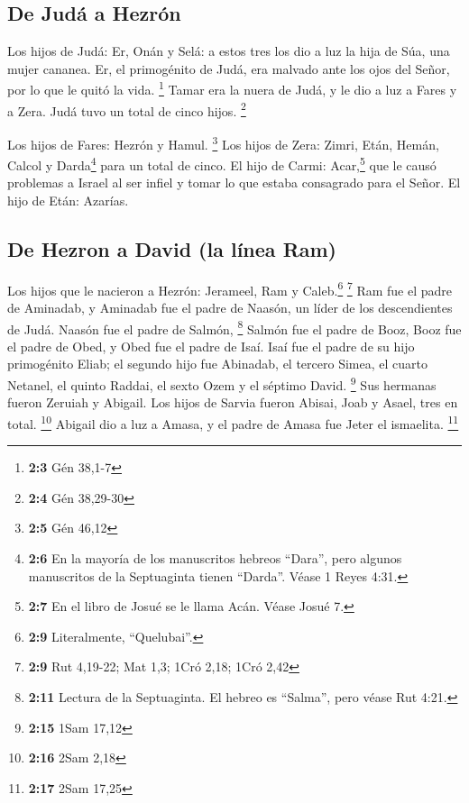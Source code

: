 \hypertarget{de-juduxe1-a-hezruxf3n}{%
\subsection{De Judá a Hezrón}\label{de-juduxe1-a-hezruxf3n}}

 Los hijos de Judá: Er, Onán y Selá: a estos tres los dio
a luz la hija de Súa, una mujer cananea. Er, el primogénito de Judá, era
malvado ante los ojos del Señor, por lo que le quitó la vida.
\footnote{\textbf{2:3} Gén 38,1-7}  Tamar era la nuera de
Judá, y le dio a luz a Fares y a Zera. Judá tuvo un total de cinco
hijos. \footnote{\textbf{2:4} Gén 38,29-30}

 Los hijos de Fares: Hezrón y Hamul. \footnote{\textbf{2:5}
  Gén 46,12}  Los hijos de Zera: Zimri, Etán, Hemán,
Calcol y Darda\footnote{\textbf{2:6} En la mayoría de los manuscritos
  hebreos ``Dara'', pero algunos manuscritos de la Septuaginta tienen
  ``Darda''. Véase 1 Reyes 4:31.} para un total de cinco. 
El hijo de Carmi: Acar,\footnote{\textbf{2:7} En el libro de Josué se le
  llama Acán. Véase Josué 7.} que le causó problemas a Israel al ser
infiel y tomar lo que estaba consagrado para el Señor.  El
hijo de Etán: Azarías.

\hypertarget{de-hezron-a-david-la-luxednea-ram}{%
\subsection{De Hezron a David (la línea
Ram)}\label{de-hezron-a-david-la-luxednea-ram}}

 Los hijos que le nacieron a Hezrón: Jerameel, Ram y
Caleb.\footnote{\textbf{2:9} Literalmente, ``Quelubai''.} \footnote{\textbf{2:9}
  Rut 4,19-22; Mat 1,3; 1Cró 2,18; 1Cró 2,42}  Ram fue el
padre de Aminadab, y Aminadab fue el padre de Naasón, un líder de los
descendientes de Judá.  Naasón fue el padre de Salmón,
\footnote{\textbf{2:11} Lectura de la Septuaginta. El hebreo es
  ``Salma'', pero véase Rut 4:21.} Salmón fue el padre de Booz,
 Booz fue el padre de Obed, y Obed fue el padre de Isaí.
 Isaí fue el padre de su hijo primogénito Eliab; el
segundo hijo fue Abinadab, el tercero Simea,  el cuarto
Netanel, el quinto Raddai,  el sexto Ozem y el séptimo
David. \footnote{\textbf{2:15} 1Sam 17,12}  Sus hermanas
fueron Zeruiah y Abigail. Los hijos de Sarvia fueron Abisai, Joab y
Asael, tres en total. \footnote{\textbf{2:16} 2Sam 2,18} 
Abigail dio a luz a Amasa, y el padre de Amasa fue Jeter el ismaelita.
\footnote{\textbf{2:17} 2Sam 17,25}

